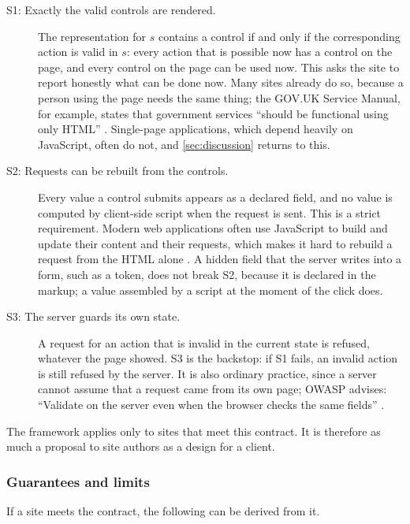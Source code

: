 \begin{description}
    \item[S1: Exactly the valid controls are rendered.]
    The representation for $s$ contains a control if and only if the corresponding action is valid in $s$: every action that is possible now has a control on the page, and every control on the page can be used now.
    This asks the site to report honestly what can be done now.
    Many sites already do so, because a person using the page needs the same thing; the GOV.UK Service Manual, for example, states that government services ``should be functional using only HTML'' \cite{govukProgressive}.
    Single-page applications, which depend heavily on JavaScript, often do not, and \autoref{sec:discussion} returns to this.
    \item[S2: Requests can be rebuilt from the controls.]
    Every value a control submits appears as a declared field, and no value is computed by client-side script when the request is sent.
    This is a strict requirement.
    Modern web applications often use JavaScript to build and update their content and their requests, which makes it hard to rebuild a request from the HTML alone \cite{fouquet2023breaking}.
    A hidden field that the server writes into a form, such as a token, does not break S2, because it is declared in the markup; a value assembled by a script at the moment of the click does.
    \item[S3: The server guards its own state.]
    A request for an action that is invalid in the current state is refused, whatever the page showed.
    S3 is the backstop: if S1 fails, an invalid action is still refused by the server.
    It is also ordinary practice, since a server cannot assume that a request came from its own page; OWASP advises: ``Validate on the server even when the browser checks the same fields'' \cite{owaspInputValidation}.
\end{description}

The framework applies only to sites that meet this contract.
It is therefore as much a proposal to site authors as a design for a client.

\subsubsection{Guarantees and limits}\label{sec:design:soundness}

If a site meets the contract, the following can be derived from it.

